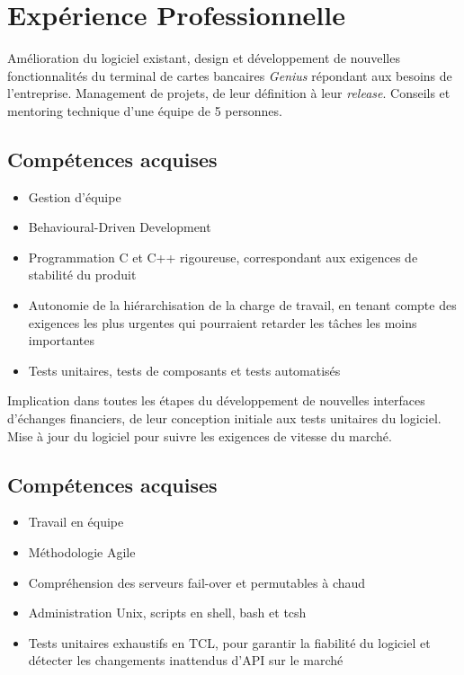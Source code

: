 \documentclass{cv}
\begin{document}
\iffalse
\contact{adresse ligne 1}
        {adresse ligne 2}
        {adresse ligne 3}
        {.....@.........}
        {+phone~number}
\fi

\section{Expérience Professionnelle}
{Amélioration du logiciel existant, design et développement de nouvelles fonctionnalités du terminal de cartes bancaires \textit{Genius} répondant aux besoins de l'entreprise. Management de projets, de leur définition à leur \textit{release}. Conseils et mentoring technique d'une équipe de 5 personnes.}
\subsection{Compétences acquises}
\begin{itemize}
    \item {Gestion d'équipe}
    \item {Behavioural-Driven Development}
    \item {Programmation C et C++ rigoureuse, correspondant aux exigences de stabilité du produit}
    \item {Autonomie de la hiérarchisation de la charge de travail, en tenant compte des exigences les plus urgentes qui pourraient retarder les tâches les moins importantes}
    \item {Tests unitaires, tests de composants et tests automatisés}
\end{itemize}

{Implication dans toutes les étapes du développement de nouvelles interfaces d'échanges financiers, de leur conception initiale aux tests unitaires du logiciel. Mise à jour du logiciel pour suivre les exigences de vitesse du marché.}
\subsection{Compétences acquises}
\begin{itemize}
    \item {Travail en équipe}
    \item {Méthodologie Agile}
    \item {Compréhension des serveurs fail-over et permutables à chaud}
    \item {Administration Unix, scripts en shell, bash et tcsh}
    \item {Tests unitaires exhaustifs en TCL, pour garantir la fiabilité du logiciel et détecter les changements inattendus d'API sur le marché}
\end{itemize}
\end{document}
